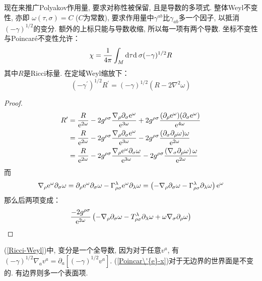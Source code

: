 现在来推广Polyakov作用量, 要求对称性被保留, 且是导数的多项式. 
整体Weyl不变性, 亦即 $\omega(\tau,\sigma)=C$ ($C$为常数), 要求作用量中$\gamma^{ab}$比$\gamma_{ab}$多一个因子, 以抵消$(-\gamma)^{1/2}$的变分. 额外的上标只能与导数收缩, 所以每一项有两个导数. 
坐标不变性与Poincar\'{e}不变性允许：
\begin{equation}
\chi=\frac{1}{4 \pi} \int_{M} \dif \tau \dif \:\sigma(-\gamma)^{1 / 2} R \label{Poincar\'{e}-x}
\end{equation}
其中$R$是Ricci标量. 在定域Weyl缩放下：
\begin{equation}
\left(-\gamma^{\prime}\right)^{1 / 2} R^{\prime}=(-\gamma)^{1 / 2}\left(R-2 \nabla^{2} \omega\right)\label{Ricci-Weyl}
\end{equation}
\begin{proof}
\begin{align*}
R^\prime &=\frac{R}{\mathrm{e}^{2 \omega}}-2 g^{\rho \sigma} \frac{\nabla_{\rho} \partial_{\sigma} \mathrm{e}^{\omega}}{\mathrm{e}^{3 \omega}}+2 g^{\rho \sigma} \frac{(\partial_\rho \mathrm{e}^\omega )(\partial _\sigma \mathrm{e}^\omega)}{\mathrm{e}^{4 \omega}} \\
&=\frac{R}{\mathrm{e}^{2 \omega}}-2 g^{\rho \sigma} \frac{\nabla_{\rho} \partial_{\sigma} \mathrm{e}^{\omega}}{\mathrm{e}^{3 \omega}}-2 g^{\rho \sigma} \frac{(\partial _\sigma \partial_{\rho} \omega )\omega}{\mathrm{e}^{2 \omega}} \\
&=\frac{R}{\mathrm{e}^{2 \omega}}-2 g^{\rho \sigma} \frac{\nabla_{\rho} \mathrm{e}^{\omega} \partial_{\sigma} \omega}{\mathrm{e}^{3 \omega}}-2 g^{\rho \sigma} \frac{\left(\nabla_{\sigma} \partial_{\rho} \omega\right) \omega}{\mathrm{e}^{2 \omega}}
\end{align*}
而
\begin{align*}
\nabla _\rho \mathrm{e}^{\omega} \partial_{\sigma} \omega=\partial_{\rho} \mathrm{e}^{\omega} \partial_{\sigma} \omega-\Gamma_{\rho \sigma}^{\lambda} \mathrm{e}^{\omega} \partial_{\lambda} \omega=\left(-\nabla_{\rho} \partial _\sigma \omega-\Gamma_{\rho \sigma}^{\lambda} \partial _\lambda \omega\right) \mathrm{e}^{\omega}
\end{align*}
那么后两项变成：
\[
\frac{-2 g^{\rho \sigma}}{\mathrm{e}^{2 \omega}}\left(-\nabla_{\rho} \partial_{\sigma} \omega-T_{\rho \sigma}^{\lambda} \partial_{\lambda} \omega+\omega \nabla_{\sigma} \partial_{\rho} \omega\right)
\]
\end{proof}
\noindent (\ref{Ricci-Weyl})中, 变分是一个全导数, 因为对于任意$v^a$, 有$(-\gamma)^{1/2}\nabla_a v^a=\partial_a[(-\gamma)^{1/2}v^a]$. (\ref{Poincar\'{e}-x})对于无边界的世界面是不变的. 有边界则多一个表面项. 

